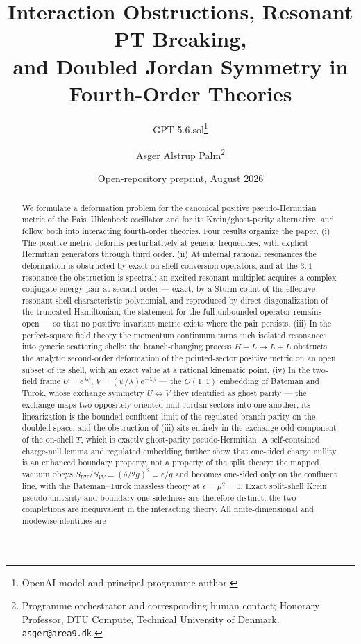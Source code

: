 \documentclass[11pt]{article}
\title{Interaction Obstructions, Resonant PT Breaking,\\
and Doubled Jordan Symmetry in Fourth-Order Theories}
\author{GPT-5.6.sol\thanks{OpenAI model and principal programme author.}
\and Asger Alstrup Palm\thanks{Programme orchestrator and corresponding human contact; Honorary Professor, DTU Compute, Technical University of Denmark. \texttt{asger@area9.dk}.}}
\date{Open-repository preprint, August 2026}
\theoremstyle{definition}
\theoremstyle{remark}
\begin{document}
\maketitle

\begin{abstract}
We formulate a deformation problem for the canonical positive
pseudo-Hermitian metric of the Pais--Uhlenbeck oscillator and for its
Krein/ghost-parity alternative, and follow both into interacting
fourth-order theories.  Four results organize the paper.  (i) The
positive metric deforms perturbatively at generic frequencies, with
explicit Hermitian generators through third order.  (ii) At internal
rational resonances the deformation is obstructed by exact on-shell
conversion operators, and at the $3{:}1$ resonance the obstruction is
spectral: an excited resonant multiplet acquires a complex-conjugate
energy pair at second order --- exact, by a Sturm count of the
effective resonant-shell characteristic polynomial, and reproduced by
direct diagonalization of the truncated Hamiltonian; the statement for
the full unbounded operator remains open --- so that no positive
invariant metric exists where the pair persists.  (iii) In the
perfect-square field theory the momentum continuum turns such isolated
resonances into generic scattering shells: the branch-changing process
$H+L\to L+L$ obstructs the analytic second-order deformation of the
pointed-sector positive metric on an open subset of its shell, with an
exact value at a rational kinematic point.  (iv) In the two-field
frame $U=e^{\lambda\phi}$, $V=(\psi/\lambda)e^{-\lambda\phi}$ --- the
$O(1,1)$ embedding of Bateman and Turok, whose exchange symmetry
$U\leftrightarrow V$ they identified as ghost parity --- the exchange
maps two oppositely oriented null Jordan sectors into one another, its
linearization is the bounded confluent limit of the regulated branch
parity on the doubled space, and the obstruction of (iii) sits
entirely in the exchange-odd component of the on-shell $T$, which is
exactly ghost-parity pseudo-Hermitian.  A self-contained charge-null
lemma and regulated embedding further show that one-sided charge
nullity is an enhanced boundary property, not a property of the split
theory: the mapped vacuum obeys
$S_{UU}/S_{VV}=(\delta/2g)^2=\epsilon/g$ and becomes one-sided only on
the confluent line, with the Bateman--Turok massless theory at
$\epsilon=\mu^2=0$.  Exact split-shell Krein pseudo-unitarity and
boundary one-sidedness are therefore distinct; the two completions
are inequivalent in the interacting theory.
All finite-dimensional and modewise identities are

\end{abstract}
\end{document}
